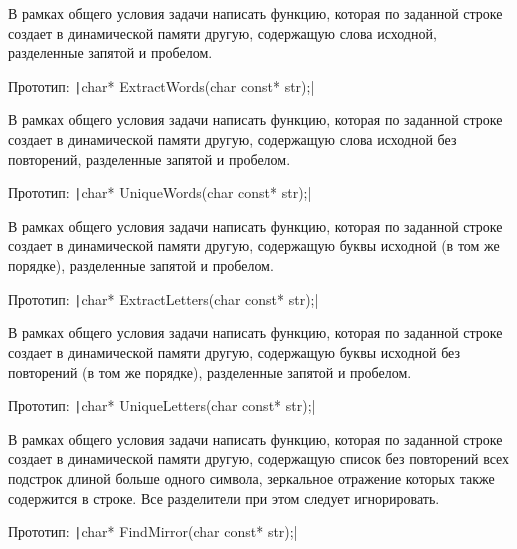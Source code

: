 \bigskip


\begin{zztask}
В рамках общего условия задачи написать функцию, которая по заданной строке
создает в динамической памяти другую, содержащую слова исходной,
разделенные запятой и пробелом.

Прототип: \texttt|char* ExtractWords(char const* str);|
\end{zztask}

\begin{zztask}
В рамках общего условия задачи написать функцию, которая по заданной строке
создает в динамической памяти другую, содержащую слова исходной без
повторений, разделенные запятой и пробелом.

Прототип: \texttt|char* UniqueWords(char const* str);|
\end{zztask}

\begin{zztask}
В рамках общего условия задачи написать функцию, которая по заданной строке
создает в динамической памяти другую, содержащую буквы исходной (в том же
порядке), разделенные запятой и пробелом.

Прототип: \texttt|char* ExtractLetters(char const* str);|
\end{zztask}

\begin{zztask}
В рамках общего условия задачи написать функцию, которая по заданной строке
создает в динамической памяти другую, содержащую буквы исходной без
повторений (в том же порядке), разделенные запятой и пробелом.

Прототип: \texttt|char* UniqueLetters(char const* str);|
\end{zztask}

\begin{zztask}
В рамках общего условия задачи написать функцию, которая по заданной строке
создает в динамической памяти другую, содержащую список без повторений всех
подстрок длиной больше одного символа, зеркальное отражение которых также
содержится в строке. Все разделители при этом следует игнорировать.

Прототип: \texttt|char* FindMirror(char const* str);|
\end{zztask}

